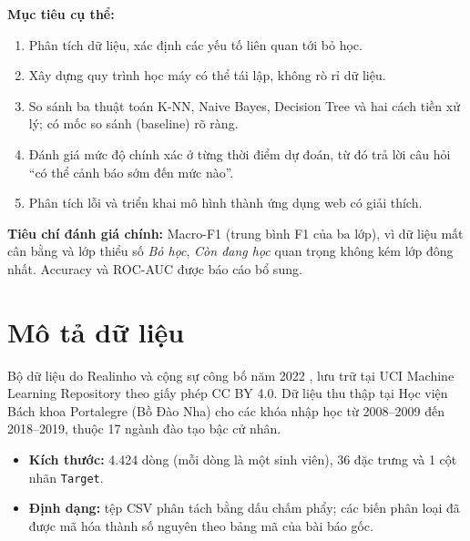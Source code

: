 \documentclass[12pt,a4paper,oneside]{report}
\newcommand{\code}[1]{\texttt{#1}}
\newcommand{\fone}{Macro-F1}
\begin{document}
\textbf{Mục tiêu cụ thể:}
\begin{enumerate}
  \item Phân tích dữ liệu, xác định các yếu tố liên quan tới bỏ học.
  \item Xây dựng quy trình học máy có thể tái lập, không rò rỉ dữ liệu.
  \item So sánh ba thuật toán K-NN, Naive Bayes, Decision Tree và hai cách tiền xử lý; có mốc so sánh (baseline) rõ ràng.
  \item Đánh giá mức độ chính xác ở từng thời điểm dự đoán, từ đó trả lời câu hỏi ``có thể cảnh báo sớm đến mức nào''.
  \item Phân tích lỗi và triển khai mô hình thành ứng dụng web có giải thích.
\end{enumerate}

\textbf{Tiêu chí đánh giá chính:} \fone{} (trung bình F1 của ba lớp), vì dữ liệu mất cân bằng và lớp thiểu số
\emph{Bỏ học}, \emph{Còn đang học} quan trọng không kém lớp đông nhất. Accuracy và ROC-AUC được báo cáo bổ sung.

\section{Mô tả dữ liệu}
Bộ dữ liệu do Realinho và cộng sự công bố năm 2022 \cite{realinho2022}, lưu trữ tại UCI Machine Learning Repository \cite{uci697}
theo giấy phép CC BY 4.0. Dữ liệu thu thập tại Học viện Bách khoa Portalegre (Bồ Đào Nha) cho các khóa nhập học từ 2008--2009
đến 2018--2019, thuộc 17 ngành đào tạo bậc cử nhân.

\begin{itemize}
  \item \textbf{Kích thước:} 4.424 dòng (mỗi dòng là một sinh viên), 36 đặc trưng và 1 cột nhãn \code{Target}.
  \item \textbf{Định dạng:} tệp CSV phân tách bằng dấu chấm phẩy; các biến phân loại đã được mã hóa thành số nguyên theo bảng mã của bài báo gốc.
\end{itemize}
\end{document}
